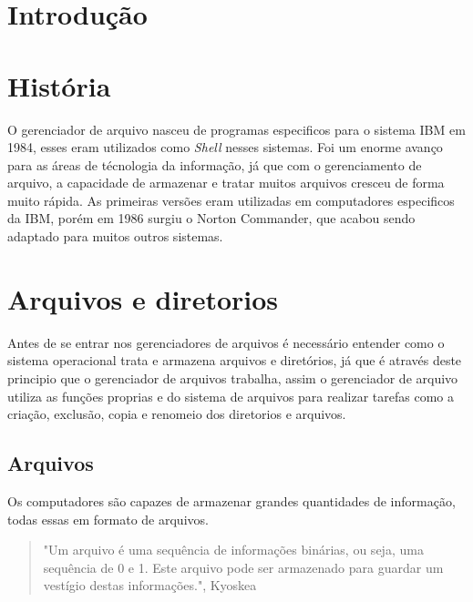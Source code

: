 \documentclass[12pt,a4paper,openany,oneside]{abntex2}
\begin{document}
\imprimircapa

\imprimirfolhaderosto

\tableofcontents

\maketitle

\section{Introdução}



\section{História}

O gerenciador de arquivo nasceu de programas especificos para o sistema IBM em 1984, esses eram utilizados como \textit{Shell} nesses sistemas. Foi um enorme avanço para as áreas de técnologia da informação, já que com o gerenciamento de arquivo, a capacidade de armazenar e tratar muitos arquivos cresceu de forma muito rápida. As primeiras versões eram utilizadas em computadores especificos da IBM, porém em 1986 surgiu o Norton Commander, que acabou sendo adaptado para muitos outros sistemas.

\section{Arquivos e diretorios}

Antes de se entrar nos gerenciadores de arquivos é necessário entender como o sistema operacional trata e armazena arquivos e diretórios, já que é através deste principio que o gerenciador de arquivos trabalha, assim o gerenciador de arquivo utiliza as funções proprias e do sistema de arquivos para realizar tarefas como a criação, exclusão, copia e renomeio dos diretorios e arquivos.

\subsection{Arquivos}

Os computadores são capazes de armazenar grandes quantidades de informação, todas essas em formato de arquivos.

 \begin{quote}
"Um arquivo é uma sequência de informações binárias, ou seja, uma sequência de 0 e 1. Este arquivo pode ser armazenado para guardar um vestígio destas informações.", Kyoskea
\end{quote}
\end{document}
